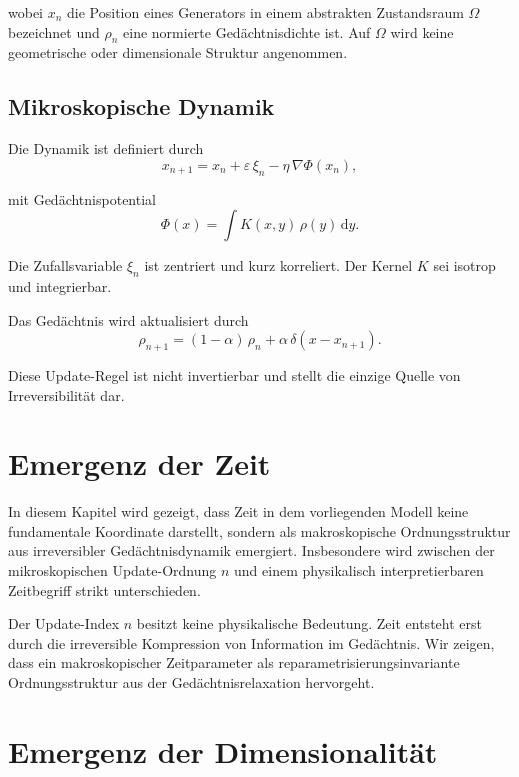 \documentclass[11pt,a4paper]{article}
\renewcommand{\dd}{\mathrm{d}}
\begin{document}
wobei $x_n$ die Position eines Generators in einem abstrakten Zustandsraum $\Omega$ bezeichnet und $\rho_n$ eine normierte Gedächtnisdichte ist. Auf $\Omega$ wird keine geometrische oder dimensionale Struktur angenommen.

\subsection{Mikroskopische Dynamik}

Die Dynamik ist definiert durch
\begin{equation}
 x_{n+1} = x_n + \varepsilon \, \xi_n - \eta \, \nabla \Phi(x_n),
\end{equation}

mit Gedächtnispotential
\begin{equation}
 \Phi(x) = \int K(x,y)\, \rho(y)\, \dd y.
\end{equation}

Die Zufallsvariable $\xi_n$ ist zentriert und kurz korreliert. Der Kernel $K$ sei isotrop und integrierbar.

Das Gedächtnis wird aktualisiert durch
\begin{equation}
 \rho_{n+1} = (1-\alpha)\, \rho_n + \alpha \, \delta(x-x_{n+1}).
\end{equation}

Diese Update-Regel ist nicht invertierbar und stellt die einzige Quelle von Irreversibilität dar.

\section{Emergenz der Zeit}

In diesem Kapitel wird gezeigt, dass Zeit in dem vorliegenden Modell keine fundamentale Koordinate darstellt, sondern als makroskopische Ordnungsstruktur aus irreversibler Gedächtnisdynamik emergiert. Insbesondere wird zwischen der mikroskopischen Update-Ordnung $n$ und einem physikalisch interpretierbaren Zeitbegriff strikt unterschieden.

Der Update-Index $n$ besitzt keine physikalische Bedeutung. Zeit entsteht erst durch die irreversible Kompression von Information im Gedächtnis. Wir zeigen, dass ein makroskopischer Zeitparameter als reparametrisierungsinvariante Ordnungsstruktur aus der Gedächtnisrelaxation hervorgeht.

\section{Emergenz der Dimensionalit\"at}
\end{document}
